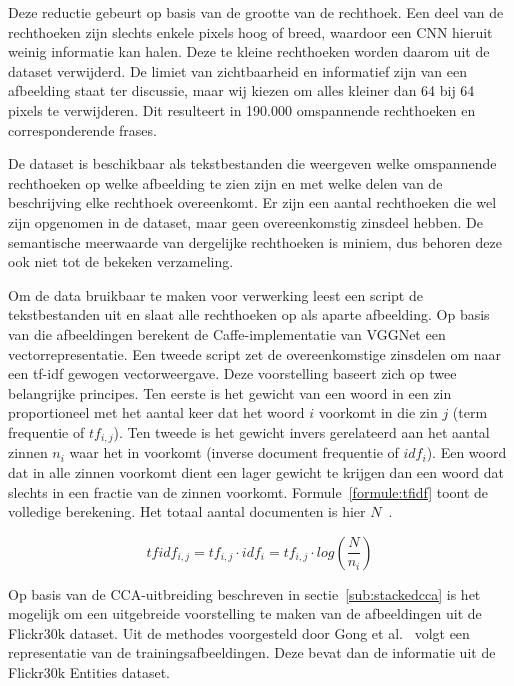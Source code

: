 Deze reductie gebeurt op basis van de grootte van de rechthoek. Een deel van de rechthoeken zijn slechts enkele pixels hoog of breed, waardoor een CNN hieruit weinig informatie kan halen. Deze te kleine rechthoeken worden daarom uit de dataset verwijderd. De limiet van zichtbaarheid en informatief zijn van een afbeelding staat ter discussie, maar wij kiezen om alles kleiner dan 64 bij 64 pixels te verwijderen. Dit resulteert in 190.000 omspannende rechthoeken en corresponderende frases. 

De dataset is beschikbaar als tekstbestanden die weergeven welke omspannende rechthoeken op welke afbeelding te zien zijn en met welke delen van de beschrijving elke rechthoek overeenkomt. Er zijn een aantal rechthoeken die wel zijn opgenomen in de dataset, maar geen overeenkomstig zinsdeel hebben. De semantische meerwaarde van dergelijke rechthoeken is miniem, dus behoren deze ook niet tot de bekeken verzameling. 

Om de data bruikbaar te maken voor verwerking leest een script de tekstbestanden uit en slaat alle rechthoeken op als aparte afbeelding. Op basis van die afbeeldingen berekent de Caffe-implementatie van VGGNet een vectorrepresentatie. Een tweede script zet de overeenkomstige zinsdelen om naar een tf-idf gewogen vectorweergave. Deze voorstelling baseert zich op twee belangrijke principes. Ten eerste is het gewicht van een woord in een zin proportioneel met het aantal keer dat het woord $i$ voorkomt in die zin $j$ (term frequentie of $tf_{i,j}$). Ten tweede is het gewicht invers gerelateerd aan het aantal zinnen $n_i$ waar het in voorkomt (inverse document frequentie of $idf_i$). Een woord dat in alle zinnen voorkomt dient een lager gewicht te krijgen dan een woord dat slechts in een fractie van de zinnen voorkomt. Formule~\eqref{formule:tfidf} toont de volledige berekening. Het totaal aantal documenten is hier $N$~\cite{Jurafsky:2009:SLP:1214993}. 

\begin{equation}
\label{formule:tfidf}
	tfidf_{i,j} = tf_{i,j}\cdot{idf_{i}} = tf_{i,j}\cdot{log(\frac{N}{n_i})}
\end{equation}

Op basis van de CCA-uitbreiding beschreven in sectie~\ref{sub:stackedcca} is het mogelijk om een uitgebreide voorstelling te maken van de afbeeldingen uit de Flickr30k dataset. Uit de methodes voorgesteld door Gong et al.~\cite{Gong2014} volgt een representatie van de trainingsafbeeldingen. Deze bevat dan de informatie uit de Flickr30k Entities dataset.

